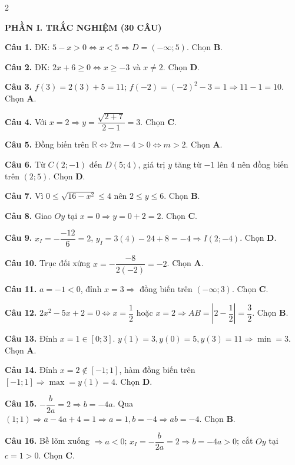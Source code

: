 \documentclass[12pt,a4paper]{article}
\begin{document}
\begin{multicols}{2}
\raggedcolumns
\footnotesize

\textbf{\color{accent}PHẦN I. TRẮC NGHIỆM (30 CÂU)}

\textbf{Câu 1.} ĐK: $5 - x > 0 \Leftrightarrow x < 5 \Rightarrow D = (-\infty; 5)$. Chọn \textbf{B}.

\textbf{Câu 2.} ĐK: $2x + 6 \ge 0 \Leftrightarrow x \ge -3$ và $x \ne 2$. Chọn \textbf{D}.

\textbf{Câu 3.} $f(3) = 2(3) + 5 = 11$; $f(-2) = (-2)^2 - 3 = 1 \Rightarrow 11 - 1 = 10$. Chọn \textbf{A}.

\textbf{Câu 4.} Với $x = 2 \Rightarrow y = \dfrac{\sqrt{2+7}}{2-1} = 3$. Chọn \textbf{C}.

\textbf{Câu 5.} Đồng biến trên $\mathbb{R} \Leftrightarrow 2m - 4 > 0 \Leftrightarrow m > 2$. Chọn \textbf{A}.

\textbf{Câu 6.} Từ $C(2; -1)$ đến $D(5; 4)$, giá trị $y$ tăng từ $-1$ lên $4$ nên đồng biến trên $(2; 5)$. Chọn \textbf{D}.

\textbf{Câu 7.} Vì $0 \le \sqrt{16 - x^2} \le 4$ nên $2 \le y \le 6$. Chọn \textbf{B}.

\textbf{Câu 8.} Giao $Oy$ tại $x = 0 \Rightarrow y = 0 + 2 = 2$. Chọn \textbf{C}.

\textbf{Câu 9.} $x_I = -\dfrac{-12}{6} = 2$, $y_I = 3(4) - 24 + 8 = -4 \Rightarrow I(2; -4)$. Chọn \textbf{D}.

\textbf{Câu 10.} Trục đối xứng $x = -\dfrac{-8}{2(-2)} = -2$. Chọn \textbf{A}.

\textbf{Câu 11.} $a = -1 < 0$, đỉnh $x = 3 \Rightarrow$ đồng biến trên $(-\infty; 3)$. Chọn \textbf{C}.

\textbf{Câu 12.} $2x^2 - 5x + 2 = 0 \Leftrightarrow x = \dfrac{1}{2}$ hoặc $x = 2 \Rightarrow AB = \left|2 - \dfrac{1}{2}\right| = \dfrac{3}{2}$. Chọn \textbf{B}.

\textbf{Câu 13.} Đỉnh $x = 1 \in [0; 3]$. $y(1) = 3, y(0) = 5, y(3) = 11 \Rightarrow \min = 3$. Chọn \textbf{A}.

\textbf{Câu 14.} Đỉnh $x = 2 \notin [-1; 1]$, hàm đồng biến trên $[-1; 1] \Rightarrow \max = y(1) = 4$. Chọn \textbf{D}.

\textbf{Câu 15.} $-\dfrac{b}{2a} = 2 \Rightarrow b = -4a$. Qua $(1; 1) \Rightarrow a - 4a + 4 = 1 \Rightarrow a = 1, b = -4 \Rightarrow ab = -4$. Chọn \textbf{B}.

\textbf{Câu 16.} Bề lõm xuống $\Rightarrow a < 0$; $x_I = -\dfrac{b}{2a} = 2 \Rightarrow b = -4a > 0$; cắt $Oy$ tại $c = 1 > 0$. Chọn \textbf{C}.


\end{multicols}
\end{document}
